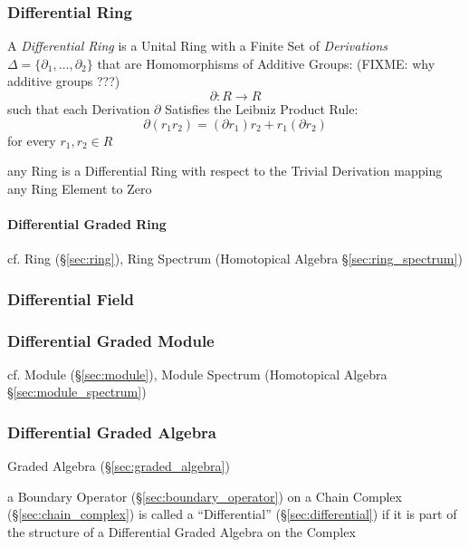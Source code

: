 \subsubsection{Differential Ring}\label{sec:differential_ring}

A \emph{Differential Ring} is a Unital Ring with a Finite Set of
\emph{Derivations} $\Delta = \{ \partial_1, \ldots, \partial_2 \}$ that are
Homomorphisms of Additive Groups: (FIXME: why additive groups ???)
\[
  \partial : R \rightarrow R
\]
such that each Derivation $\partial$ Satisfies the Leibniz Product Rule:
\[
  \partial(r_1r_2) = (\partial{r_1})r_2 + r_1(\partial{r_2})
\]
for every $r_1, r_2 \in R$


any Ring is a Differential Ring with respect to the Trivial Derivation mapping
any Ring Element to Zero



\paragraph{Differential Graded Ring}\label{sec:differential_graded_ring}\hfill

cf. Ring (\S\ref{sec:ring}), Ring Spectrum (Homotopical Algebra
\S\ref{sec:ring_spectrum})



\subsubsection{Differential Field}\label{sec:differential_field}

\subsubsection{Differential Graded Module}\label{sec:differential_graded_module}

cf. Module (\S\ref{sec:module}), Module Spectrum (Homotopical Algebra
\S\ref{sec:module_spectrum})



\subsubsection{Differential Graded Algebra}
\label{sec:differential_graded_algebra}

Graded Algebra (\S\ref{sec:graded_algebra})

a Boundary Operator (\S\ref{sec:boundary_operator}) on a Chain Complex
(\S\ref{sec:chain_complex}) is called a ``Differential''
(\S\ref{sec:differential}) if it is part of the structure of a Differential
Graded Algebra on the Complex

